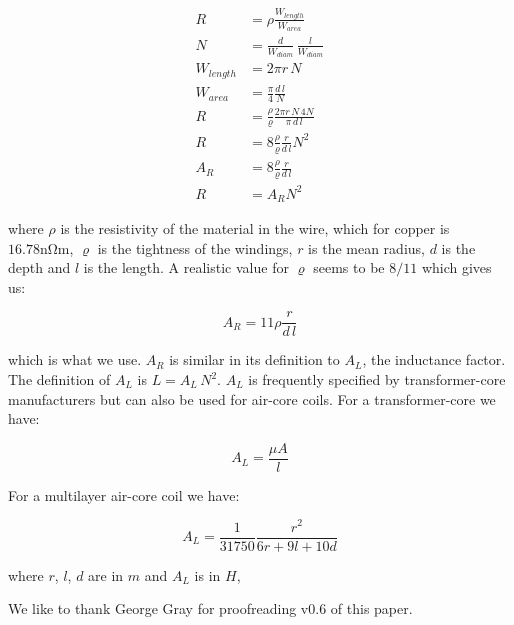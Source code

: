 \documentclass[]{elementary-physics}
\begin{document}
\begin{subequations}
\begin{align}
R &= \rho \frac{W_{length}}{W_{area}} \\
N &= \frac{d}{W_{diam}} \, \frac{l}{W_{diam}} \\
W_{length} &= 2 \pi r \, N \\
W_{area} &= \frac{\pi}{4} \frac{d \, l}{N} \\
R &= \frac{\rho}{\varrho} \frac{2 \pi r \, N \, 4 N}{\pi \, d \, l} \\
R &= 8 \frac{\rho}{\varrho} \frac{r}{d \, l} N^2 \\
A_R &= 8 \frac{\rho}{\varrho} \frac{r}{d \, l} \\
R &= A_R N^2
\end{align}
\end{subequations}

where $\rho$ is the resistivity of the material in the wire, which for copper is $16.78 \si{\nano\ohm\metre}$, $\varrho$ is the tightness of the windings, $r$ is the mean radius, $d$ is the depth and $l$ is the length.
A realistic value for $\varrho$ seems to be $8/11$ which gives us:

\begin{equation}
A_R = 11 \rho \frac{r}{d \, l}
\end{equation}

which is what we use.
$A_R$ is similar in its definition to $A_L$, the inductance factor.
The definition of $A_L$ is $L = A_L \, N^2$.
$A_L$ is frequently specified by transformer-core manufacturers but can also be used for air-core coils. 
For a transformer-core we have:

\begin{equation}
A_L = \frac{\mu A}{l}
\end{equation}

For a multilayer air-core coil we have\cite{wpind}:

\begin{equation}
A_L = \frac{1}{31750} \frac{r^2}{6r+9l+10d}
\end{equation}

where $r$, $l$, $d$ are in $m$ and $A_L$ is in $H$,



We like to thank George Gray for proofreading v0.6 of this paper.

\printbibliography
\end{document}
